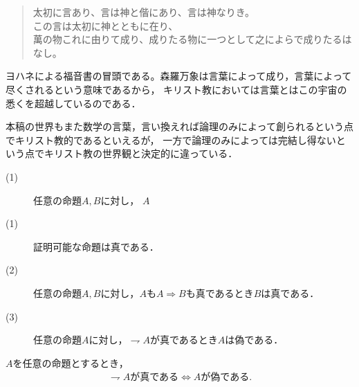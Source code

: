 	\begin{quote}
		太初に言あり、言は神と偕にあり、言は神なりき。\\
		この言は太初に神とともに在り、\\
		萬の物これに由りて成り、成りたる物に一つとして之によらで成りたるはなし。
	\end{quote}
	ヨハネによる福音書の冒頭である。森羅万象は言葉によって成り，言葉によって尽くされるという意味であるから，
	キリスト教においては言葉とはこの宇宙の悉くを超越しているのである．
	\begin{comment}
		実際に自然言語の発生が事物の観測なしに起こり得たかという問題は言語哲学上も決着がついていないらしいが，
		少なくとも
	\end{comment}
	本稿の世界もまた数学の言葉，言い換えれば論理のみによって創られるという点でキリスト教的であるといえるが，
	一方で論理のみによっては完結し得ないという点でキリスト教の世界観と決定的に違っている．
	
	\begin{screen}
		\begin{axm}[命題論理の公理]\mbox{}
			\begin{description}
				\item[(1)] 任意の命題$A,B$に対し，
					$A $
				\item[(1)] 証明可能な命題は真である．
				\item[(2)] 任意の命題$A,B$に対し，$A$も$A \Longrightarrow B$も真であるとき$B$は真である．
				\item[(3)] 任意の命題$A$に対し，$\rightharpoondown A$が真であるとき$A$は偽である．
			\end{description}
		\end{axm}
	\end{screen}
	
	\begin{screen}
		\begin{thm}
			$A$を任意の命題とするとき，
			\begin{align}
				\mbox{$\rightharpoondown A$が真である} \Longleftrightarrow \mbox{$A$が偽である}.
			\end{align}
		\end{thm}
	\end{screen}